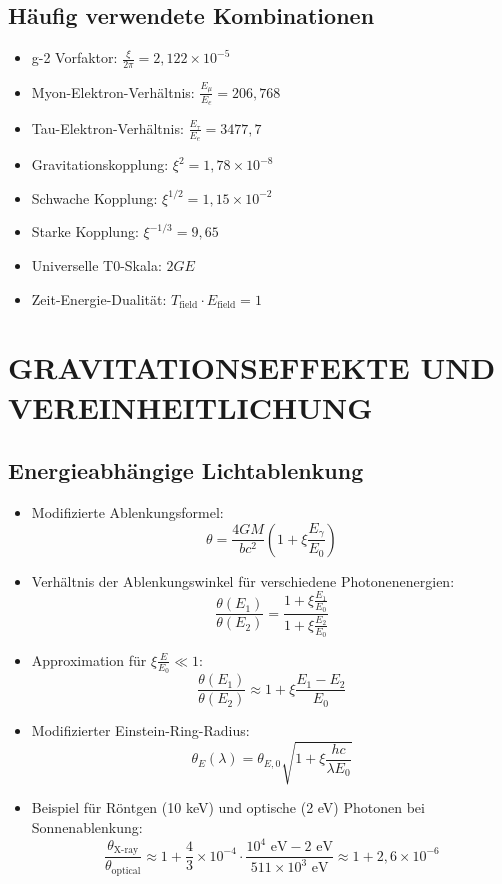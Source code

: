 \documentclass[12pt,a4paper]{article}
\begin{document}
	\subsection{H\"{a}ufig verwendete Kombinationen}
	\begin{itemize}
		\item g-2 Vorfaktor: $\frac{\xi}{2\pi} = 2,122 \times 10^{-5}$
		\item Myon-Elektron-Verh\"{a}ltnis: $\frac{E_\mu}{E_e} = 206,768$
		\item Tau-Elektron-Verh\"{a}ltnis: $\frac{E_\tau}{E_e} = 3477,7$
		\item Gravitationskopplung: $\xi^2 = 1,78 \times 10^{-8}$
		\item Schwache Kopplung: $\xi^{1/2} = 1,15 \times 10^{-2}$
		\item Starke Kopplung: $\xi^{-1/3} = 9,65$
		\item Universelle T0-Skala: $2GE$
		\item Zeit-Energie-Dualit\"{a}t: $T_{\text{field}} \cdot E_{\text{field}} = 1$
	\end{itemize}
	
	\section{GRAVITATIONSEFFEKTE UND VEREINHEITLICHUNG}
	


	\subsection{Energieabh\"{a}ngige Lichtablenkung}
	\begin{itemize}
		\item Modifizierte Ablenkungsformel:
		$$\boxed{\theta = \frac{4GM}{bc^2}\left(1 + \xi \frac{E_\gamma}{E_0}\right)}$$
		
		\item Verh\"{a}ltnis der Ablenkungswinkel f\"{u}r verschiedene Photonenenergien:
		$$\frac{\theta(E_1)}{\theta(E_2)} = \frac{1 + \xi \frac{E_1}{E_0}}{1 + \xi \frac{E_2}{E_0}}$$
		
		\item Approximation f\"{u}r $\xi \frac{E}{E_0} \ll 1$:
		$$\frac{\theta(E_1)}{\theta(E_2)} \approx 1 + \xi \frac{E_1 - E_2}{E_0}$$
		
		\item Modifizierter Einstein-Ring-Radius:
		$$\theta_E(\lambda) = \theta_{E,0} \sqrt{1 + \xi \frac{hc}{\lambda E_0}}$$
		
		\item Beispiel f\"{u}r R\"{o}ntgen (10 keV) und optische (2 eV) Photonen bei Sonnenablenkung:
		$$\frac{\theta_{\text{X-ray}}}{\theta_{\text{optical}}} \approx 1 + \frac{4}{3} \times 10^{-4} \cdot \frac{10^4 \text{ eV} - 2 \text{ eV}}{511 \times 10^3 \text{ eV}} \approx 1 + 2,6 \times 10^{-6}$$
	\end{itemize}
	
\end{document}
